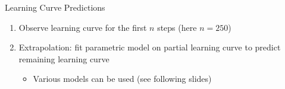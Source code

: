 \begin{frame}{Learning Curve Predictions}
\begin{figure}
    \centering
    
\end{figure}


\begin{enumerate}
  \item Observe learning curve for the first $n$ steps (here $n=250$)
  \pause
  \item \alert{Extrapolation}: fit parametric model on partial learning curve to predict remaining learning curve
  \pause
  \begin{itemize}
      \item Various models can be used (see following slides) 
  \end{itemize}
  
  
\end{enumerate}

\end{frame}

